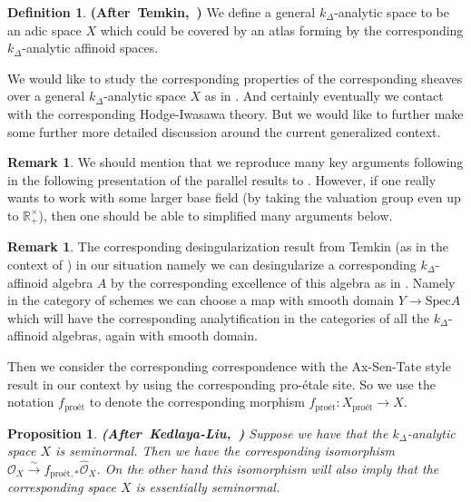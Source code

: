 \documentclass[12pt]{amsart}
\newtheorem{proposition}[theorem]{Proposition}
\theoremstyle{definition}
\newtheorem{definition}[theorem]{Definition}
\newtheorem{remark}[theorem]{Remark}
\numberwithin{equation}{section}
\begin{document}
\begin{definition}\mbox{\bf{(After Temkin, \cite[Part I Chapter I.3]{DFN})}} 
We define a general $k_\Delta$-analytic space to be an adic space $X$ which could be covered by an atlas forming by the corresponding $k_\Delta$-analytic affinoid spaces. 
	
\end{definition}


\indent We would like to study the corresponding properties of the corresponding sheaves over a general $k_\Delta$-analytic space $X$ as in \cite{KL16}. And certainly eventually we contact with the corresponding Hodge-Iwasawa theory. But we would like to further make some further more detailed discussion around the current generalized context.


\begin{remark}
We should mention that we reproduce many key arguments following \cite[Chapter 8]{KL16} in the following presentation of the parallel results to \cite[Chapter 8]{KL16}. However, if one really wants to work with some larger base field (by taking the valuation group even up to $\mathbb{R}_+^\times$), then one should be able to simplified many arguments below.	
\end{remark}





\begin{remark} \label{remark6.6}
The corresponding desingularization result from Temkin (as in the context of \cite[Remark 8.1.2]{KL16}) in our situation namely we can desingularize a corresponding $k_\Delta$-affinoid algebra $A$ by the corresponding excellence of this algebra as in \cite[Part I Chapter I Fact 3.1.2.1]{DFN}. Namely in the category of schemes we can choose a map with smooth domain $Y\rightarrow \mathrm{Spec}A$ which will have the corresponding analytification in the categories of all the $k_\Delta$-affinoid algebras, again with smooth domain.	
\end{remark}








\indent Then we consider the corresponding correspondence with the Ax-Sen-Tate style result in our context by using the corresponding pro-\'etale site. So we use the notation $f_\text{pro\'et}$ to denote the corresponding morphism $f_\text{pro\'et}:X_\text{pro\'et}\rightarrow X$.


\begin{proposition} \mbox{\bf{(After Kedlaya-Liu, \cite[Theorem 8.2.3]{KL16})}}
Suppose we have that the $k_\Delta$-analytic space $X$ is seminormal. Then we have the corresponding isomorphism $\mathcal{O}_X\overset{\sim}{\rightarrow}f_{\text{pro\'et},*}\widehat{\mathcal{O}}_X$. On the other hand this isomorphism will also imply that the corresponding space $X$ is essentially seminormal.	
\end{proposition}
\end{document}
